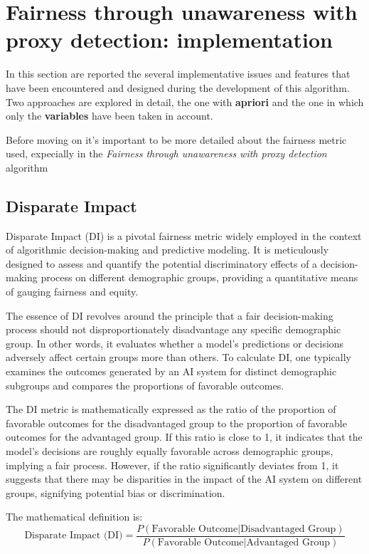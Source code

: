 \documentclass[12pt,a4paper,openright,twoside]{book}
\begin{document}
\section{Fairness through unawareness with proxy detection: implementation}
In this section are reported the several implementative issues and features that have been encountered and designed during the development of this algorithm. Two approaches are explored in detail, the one with \textbf{apriori} and the one in which only the \textbf{variables} have been taken in account. 

Before moving on it's important to be more detailed about the fairness metric used, expecially in the \emph{Fairness through unawareness with proxy detection} algorithm 
\subsection{Disparate Impact}
Disparate Impact (DI) is a pivotal fairness metric widely employed in the context of algorithmic decision-making and predictive modeling. It is meticulously designed to assess and quantify the potential discriminatory effects of a decision-making process on different demographic groups, providing a quantitative means of gauging fairness and equity. 

The essence of DI revolves around the principle that a fair decision-making process should not disproportionately disadvantage any specific demographic group. In other words, it evaluates whether a model's predictions or decisions adversely affect certain groups more than others. To calculate DI, one typically examines the outcomes generated by an AI system for distinct demographic subgroups and compares the proportions of favorable outcomes. 

The DI metric is mathematically expressed as the ratio of the proportion of favorable outcomes for the disadvantaged group to the proportion of favorable outcomes for the advantaged group. If this ratio is close to 1, it indicates that the model's decisions are roughly equally favorable across demographic groups, implying a fair process. However, if the ratio significantly deviates from 1, it suggests that there may be disparities in the impact of the AI system on different groups, signifying potential bias or discrimination.

The mathematical definition is:
\[
\text{Disparate Impact (DI)} = \frac{P(\text{Favorable Outcome} | \text{Disadvantaged Group})}{P(\text{Favorable Outcome} | \text{Advantaged Group})}
\]
\end{document}
